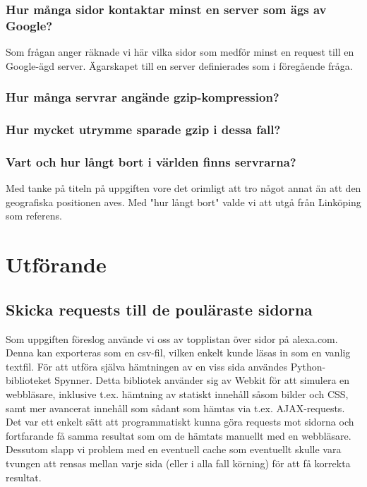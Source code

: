 \documentclass[a4paper]{article}
\begin{document}
\subsubsection{Hur många sidor kontaktar minst en server som ägs av Google?}
Som frågan anger räknade vi här vilka sidor som medför minst en request till en Google-ägd server. Ägarskapet till en server definierades som i föregående fråga.\\

\subsubsection{Hur många servrar angände gzip-kompression?}

\subsubsection{Hur mycket utrymme sparade gzip i dessa fall?}

\subsubsection{Vart och hur långt bort i världen finns servrarna?}
Med tanke på titeln på uppgiften vore det orimligt att tro något annat än att den geografiska positionen aves. Med "hur långt bort" valde vi att utgå från Linköping som referens.


\section{Utförande}
\subsection{Skicka requests till de pouläraste sidorna}
Som uppgiften föreslog använde vi oss av topplistan över sidor på alexa.com. Denna kan exporteras som en csv-fil, vilken enkelt kunde läsas in som en vanlig textfil. För att utföra själva hämtningen av en viss sida användes Python-biblioteket Spynner. Detta bibliotek använder sig av Webkit för att simulera en webbläsare, inklusive t.ex. hämtning av statiskt innehåll såsom bilder och CSS, samt mer avancerat innehåll som sådant som hämtas via t.ex. AJAX-requests. Det var ett enkelt sätt att programmatiskt kunna göra requests mot sidorna och fortfarande få samma resultat som om de hämtats manuellt med en webbläsare. Dessutom slapp vi problem med en eventuell cache som eventuellt skulle vara tvungen att rensas mellan varje sida (eller i alla fall körning) för att få korrekta resultat.\\
\end{document}
